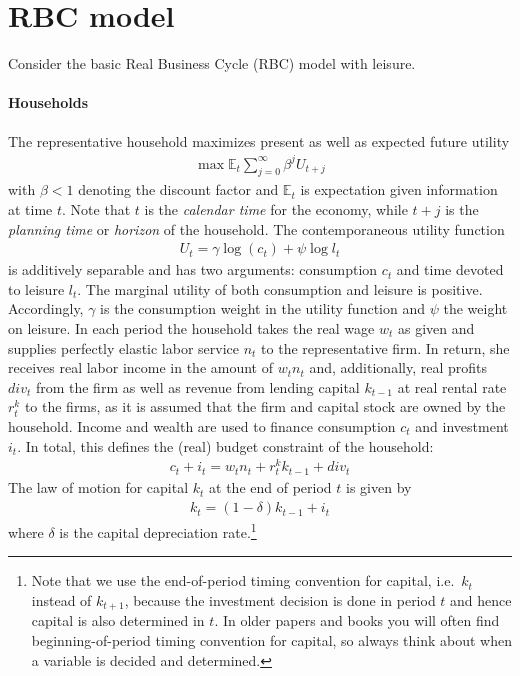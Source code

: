 \section[RBC model]{RBC model\label{ex:RBCModel}}
Consider the basic Real Business Cycle (RBC) model with leisure.

\paragraph{Households}
The representative household maximizes present as well as expected future utility
\begin{align*}
\max \mathbb{E}_{t} \sum_{j=0}^{\infty} \beta^{j} U_{t+j}
\end{align*}
with \(\beta <1\) denoting the discount factor and \(\mathbb{E}_{t}\) is expectation given information at time \(t\).
Note that \(t\) is the \emph{calendar time} for the economy,
  while \(t+j\) is the \emph{planning time} or \emph{horizon} of the household.
The contemporaneous utility function
\begin{align*}
U_t = \gamma \log(c_t) + \psi \log{l_t}
\end{align*}
is additively separable and has two arguments: consumption \(c_t\) and time devoted to leisure \(l_{t}\).
The marginal utility of both consumption and leisure is positive.
Accordingly, \(\gamma \) is the consumption weight in the utility function
  and \(\psi \) the weight on leisure.
In each period the household takes the real wage \(w_t\) as given
  and supplies perfectly elastic labor service \(n_t\) to the representative firm.
In return, she receives real labor income in the amount of \(w_t n_{t}\) and, additionally,
  real profits \({div}_t\) from the firm as well as
  revenue from lending capital \(k_{t-1}\) at real rental rate \(r^{k}_{t}\) to the firms,
  as it is assumed that the firm and capital stock are owned by the household.
Income and wealth are used to finance consumption \(c_t\) and investment \(i_t\).
In total, this defines the (real) budget constraint of the household:
\begin{align*}
c_t + i_t = w_t n_{t} + r^{k}_{t} k_{t-1} + {div}_t
\end{align*}
The law of motion for capital \(k_t\) at the end of period \(t\) is given by
\begin{align*}
k_{t} = (1-\delta) k_{t-1} + i_t
\end{align*}
where \(\delta \) is the capital depreciation rate.\footnote{%
  Note that we use the end-of-period timing convention for capital, i.e.\
    \(k_t\) instead of \(k_{t+1}\),
    because the investment decision is done in period \(t\) and hence capital is also determined in \(t\).
  In older papers and books you will often find beginning-of-period timing convention for capital,
    so always think about when a variable is decided and determined.
}
  

